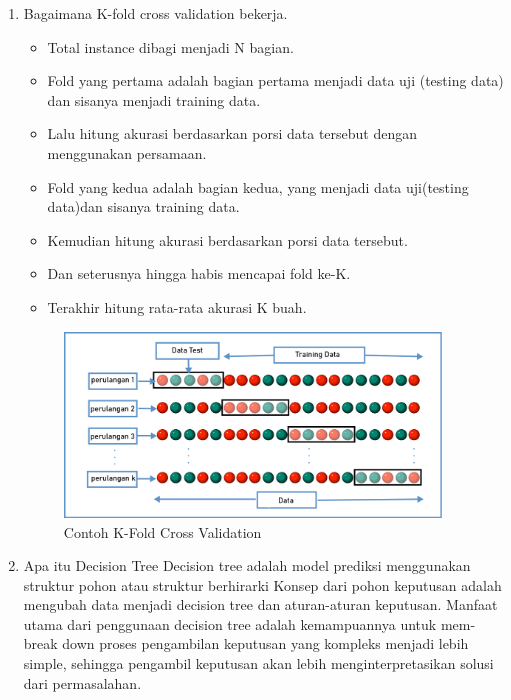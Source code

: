 \begin{enumerate}
	\item Bagaimana K-fold cross validation bekerja.
	\begin{itemize}
		\item Total instance dibagi menjadi N bagian.
		\item Fold yang pertama adalah bagian pertama menjadi data uji (testing data) dan sisanya menjadi training data.
		\item Lalu hitung akurasi berdasarkan porsi data tersebut dengan menggunakan persamaan.
		\item Fold yang kedua adalah bagian kedua, yang menjadi data uji(testing data)dan sisanya training  data.
		\item Kemudian hitung akurasi berdasarkan porsi data tersebut.
		\item Dan seterusnya hingga habis mencapai fold ke-K.
		\item Terakhir hitung rata-rata akurasi K buah.
	\end{itemize}
	
	\begin{figure}[H]
		\begin{center}
		 \includegraphics[width=10cm]{figures/1174076/figures2/7.png}
		 \caption{Contoh K-Fold Cross Validation}	
		\end{center}
	\end{figure}		
			

	\item Apa itu Decision Tree
	Decision tree adalah model prediksi menggunakan struktur pohon atau struktur berhirarki
Konsep dari pohon keputusan adalah mengubah data menjadi decision tree dan aturan-aturan keputusan. 
Manfaat utama dari penggunaan decision tree adalah kemampuannya untuk mem-break down proses pengambilan keputusan yang kompleks menjadi lebih simple, sehingga pengambil keputusan akan lebih menginterpretasikan solusi dari permasalahan.


\end{enumerate}
